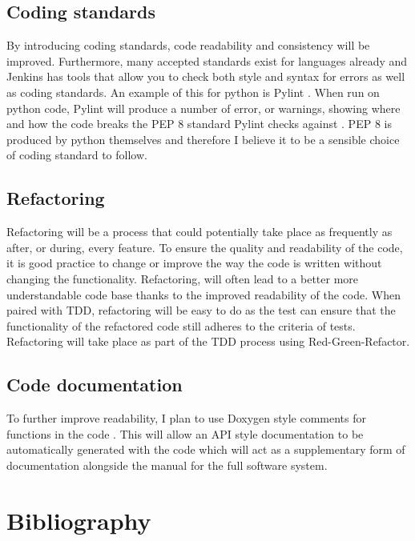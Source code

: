 \documentclass{article}
\begin{document}
\subsection{Coding standards}
By introducing coding standards, code readability and consistency will be improved. Furthermore, many accepted standards exist for languages already and Jenkins has tools that allow you to check both style and syntax for errors as well as coding standards. An example of this for python is Pylint \cite{pylint}. When run on python code, Pylint will produce a number of error, or warnings, showing where and how the code breaks the PEP 8 standard Pylint checks against \cite{pep8}. PEP 8 is produced by python themselves and therefore I believe it to be a sensible choice of coding standard to follow.

\subsection{Refactoring}
Refactoring will be a process that could potentially take place as frequently as after, or during, every feature. To ensure the quality and readability of the code, it is good practice to change or improve the way the code is written without changing the functionality. Refactoring, will often lead to a better more understandable code base thanks to the improved readability of the code. When paired with TDD, refactoring will be easy to do as the test can ensure that the functionality of the refactored code still adheres to the criteria of tests. Refactoring will take place as part of the TDD process using Red-Green-Refactor.

\subsection{Code documentation}
To further improve readability, I plan to use Doxygen style comments for functions in the code \cite{Doxygen}. This will allow an API style documentation to be automatically generated with the code which will act as a supplementary form of documentation alongside the manual for the full software system.


\nocite{*} %

\newpage


\section{Bibliography}
\end{document}
